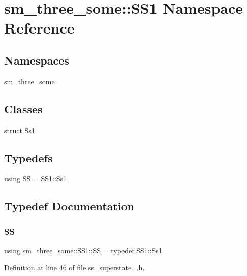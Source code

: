 \hypertarget{namespacesm__three__some_1_1SS1}{}\section{sm\+\_\+three\+\_\+some\+:\+:S\+S1 Namespace Reference}
\label{namespacesm__three__some_1_1SS1}
\subsection*{Namespaces}
\begin{DoxyCompactItemize}
\item 
 \hyperlink{namespacesm__three__some_1_1SS1_1_1sm__three__some}{sm\+\_\+three\+\_\+some}
\end{DoxyCompactItemize}
\subsection*{Classes}
\begin{DoxyCompactItemize}
\item 
struct \hyperlink{structsm__three__some_1_1SS1_1_1Ss1}{Ss1}
\end{DoxyCompactItemize}
\subsection*{Typedefs}
\begin{DoxyCompactItemize}
\item 
using \hyperlink{namespacesm__three__some_1_1SS1_ac4d8073976f20771e5e3e2320b19014f}{SS} = \hyperlink{structsm__three__some_1_1SS1_1_1Ss1}{S\+S1\+::\+Ss1}
\end{DoxyCompactItemize}


\subsection{Typedef Documentation}
\mbox{\label{namespacesm__three__some_1_1SS1_ac4d8073976f20771e5e3e2320b19014f}} 
\subsubsection{\texorpdfstring{SS}{SS}}
{\footnotesize\ttfamily using \hyperlink{namespacesm__three__some_1_1SS1_ac4d8073976f20771e5e3e2320b19014f}{sm\+\_\+three\+\_\+some\+::\+S\+S1\+::\+SS} = typedef \hyperlink{structsm__three__some_1_1SS1_1_1Ss1}{S\+S1\+::\+Ss1}}



Definition at line 46 of file ss\+\_\+superstate\+\_.\+h.

